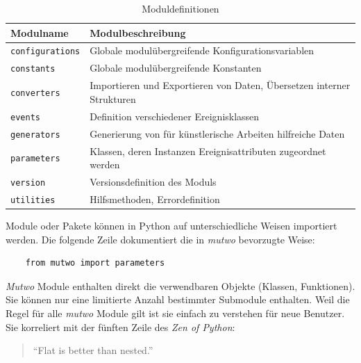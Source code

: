 \documentclass[12pt,a4paper,ngerman]{article}
\begin{document}
\begin{table}[h!]
    \begin{center}
        \begin{tabular}{l l} 
            \hline
            Modulname & Modulbeschreibung \\ [0.5ex] 
            \hline\hline
            \texttt{configurations} & Globale modulübergreifende Konfigurationsvariablen \\
            \texttt{constants} & Globale modulübergreifende Konstanten \\
            \texttt{converters} & Importieren und Exportieren von Daten, Übersetzen interner Strukturen \\
            \texttt{events} & Definition verschiedener Ereignisklassen \\
            \texttt{generators} & Generierung von für künstlerische Arbeiten hilfreiche Daten \\
            \texttt{parameters} & Klassen, deren Instanzen Ereignisattributen zugeordnet werden \\
            \texttt{version} & Versionsdefinition des Moduls \\
            \texttt{utilities} & Hilfsmethoden, Errordefinition \\ [1ex] 
            \hline
        \end{tabular}\label{table:modulDefinition}
    \end{center}

    \caption{Moduldefinitionen}
\end{table}

Module oder Pakete können in Python auf unterschiedliche Weisen importiert werden.
Die folgende Zeile dokumentiert die in \emph{mutwo} bevorzugte Weise:

\lstset{language=Python}

\begin{lstlisting}
    from mutwo import parameters
\end{lstlisting}

\emph{Mutwo} Module enthalten direkt die verwendbaren Objekte (Klassen, Funktionen).
Sie können nur eine limitierte Anzahl bestimmter Submodule enthalten.
Weil die Regel für alle \emph{mutwo} Module gilt ist sie einfach zu verstehen für neue Benutzer.
Sie korreliert mit der fünften Zeile des \emph{Zen of Python}:

\begin{quote}
    ``Flat is better than nested.''
\end{quote}
\end{document}
